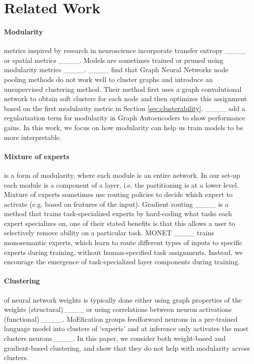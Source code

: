 \section{Related Work}
\label{sec:related}

\paragraph{Modularity} metrics inspired by research in neuroscience incorporate transfer entropy ____ %
or spatial metrics ____. %
Models are sometimes trained or pruned using modularity metrics ____.
____ find that Graph Neural Networks node pooling methods do not work well to cluster graphs and introduce an unsupervised clustering method.
Their method first uses a graph convolutional network to obtain soft clusters for each node and then 
optimizes this assignment based on the first modularity metric in Section \ref{sec:clusterability}.
____ add a regularization term for modularity in Graph Autoencoders to show performance gains. In this work, we focus on how modularity can help us train models to be more interpretable.


\paragraph{Mixture of experts} is a form of modularity, where each module is an entire network. In our set-up each module is a component of a layer, i.e. the partitioning is at a lower level. Mixture of experts sometimes use routing policies to decide which expert to activate (e.g. based on features of the input).
Gradient routing ____ is a method that trains task-specialized experts by hard-coding what tasks each expert specializes on, one of their stated benefits is that this allows a user to selectively remove ability on a particular task. 
MONET ____ trains monosemantic experts, which learn to route different types of inputs to specific experts during training, without human-specified task assignments.
Instead, we encourage the emergence of task-specialized layer components during training.

\paragraph{Clustering} of neural network weights is typically done either using graph properties of the weights (structural)____ or using correlations between neuron activations (functional) ____.
MoEfication groups feedforward neurons in a pre-trained language model into clusters of `experts' and at inference only activates the most clusters neurons____. In this paper, we consider both weight-based and gradient-based clustering, and show that they do not help with modularity across clusters.

